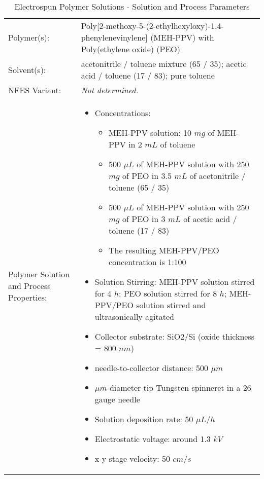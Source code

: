 
\begin{table}[th]
\caption{Electrospun Polymer Solutions - Solution and Process Parameters}
\begin{center}
\begin{tabular}{
>{\raggedright\arraybackslash}p{}
>{\raggedright\arraybackslash}p{} }

\hline
Polymer(s): &
Poly[2-methoxy-5-(2-ethylhexyloxy)-1,4-phenylenevinylene] (MEH-PPV) with Poly(ethylene oxide) (PEO) \\

\arrayrulecolor{lightgray}\hline
Solvent(s): &
acetonitrile / toluene mixture (65 / 35); acetic acid / toluene (17 / 83); pure toluene \\

\hline
NFES Variant: &
\emph{Not determined.} \\

\hline
Polymer Solution and Process Properties: &
\begin{itemize}[leftmargin=*]
\item Concentrations:
    \begin{itemize}[leftmargin=*]
    \item MEH-PPV solution: 10 $m g$ of MEH-PPV in 2 $m L$ of toluene
    \item 500 $\mu L$ of MEH-PPV solution with 250 $m g$ of PEO in 3.5 $m L$ of acetonitrile / toluene (65 / 35)
    \item 500 $\mu L$ of MEH-PPV solution with 250 $m g$ of PEO in 3 $m L$ of acetic acid / toluene (17 / 83)
    \item The resulting MEH-PPV/PEO concentration is 1:100
    \end{itemize}
\item Solution Stirring: MEH-PPV solution stirred for 4 $h$; PEO solution stirred for 8 $h$; MEH-PPV/PEO solution stirred and ultrasonically agitated
\item Collector substrate: SiO2/Si (oxide thickness = 800 $n m$)
\item needle-to-collector distance: 500 $\mu m$
\item $\mu m$-diameter tip Tungsten spinneret in a 26 gauge needle
\item Solution deposition rate: 50 $\mu L / h$
\item Electrostatic voltage: around 1.3 $k V$
\item x-y stage velocity: 50 $c m / s$
\end{itemize} \\


\end{tabular}
\end{center}
\end{table}

